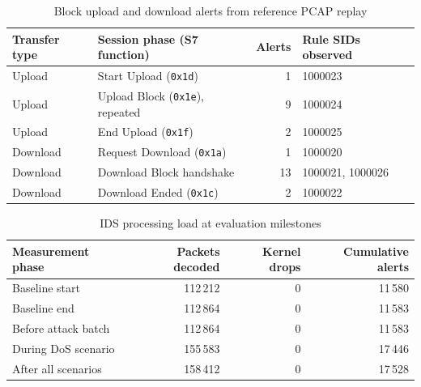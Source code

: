 \begin{table}[H]
    \centering
    \footnotesize
    \begin{tabular}{|l|l|r|l|}
        \hline
        \textbf{Transfer type} & \textbf{Session phase (S7 function)} & \textbf{Alerts} & \textbf{Rule SIDs observed} \\
        \hline
        Upload & Start Upload (\texttt{0x1d}) & 1 & 1000023 \\
        \hline
        Upload & Upload Block (\texttt{0x1e}), repeated & 9 & 1000024 \\
        \hline
        Upload & End Upload (\texttt{0x1f}) & 2 & 1000025 \\
        \hline
        Download & Request Download (\texttt{0x1a}) & 1 & 1000020 \\
        \hline
        Download & Download Block handshake & 13 & 1000021, 1000026 \\
        \hline
        Download & Download Ended (\texttt{0x1c}) & 2 & 1000022 \\
        \hline
    \end{tabular}
    \caption{Block upload and download alerts from reference PCAP replay}
    \label{tab:eval-block-transfer}
\end{table}

\begin{table}[H]
    \centering
    \footnotesize
    \begin{tabular}{|l|r|r|r|}
        \hline
        \textbf{Measurement phase} & \textbf{Packets decoded} & \textbf{Kernel drops} & \textbf{Cumulative alerts} \\
        \hline
        Baseline start & 112\,212 & 0 & 11\,580 \\
        \hline
        Baseline end & 112\,864 & 0 & 11\,583 \\
        \hline
        Before attack batch & 112\,864 & 0 & 11\,583 \\
        \hline
        During DoS scenario & 155\,583 & 0 & 17\,446 \\
        \hline
        After all scenarios & 158\,412 & 0 & 17\,528 \\
        \hline
    \end{tabular}
    \caption{IDS processing load at evaluation milestones}
    \label{tab:eval-performance}
\end{table}

